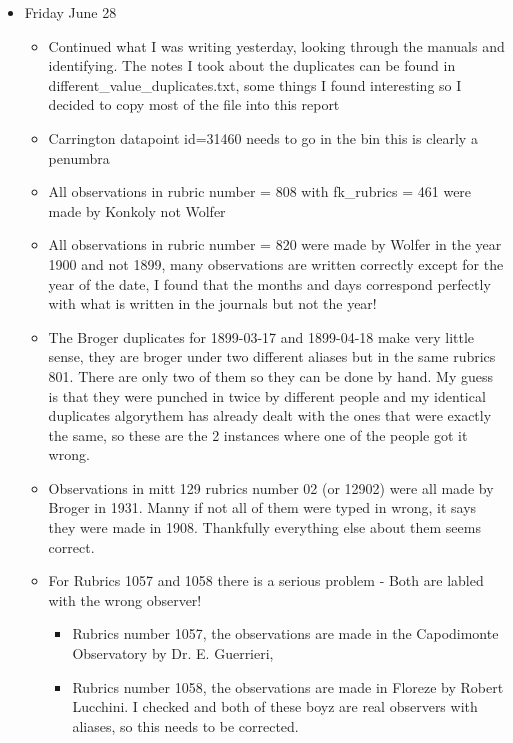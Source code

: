 \documentclass[12pt]{article}
\begin{document}
\begin{itemize}
\item Friday June 28 
    \begin{itemize}
        \item Continued what I was writing yesterday, looking through the manuals and identifying. The notes I took about the duplicates can be found in different\_value\_duplicates.txt, some things I found interesting so I decided to copy most of the file into this report
        \item Carrington datapoint id=31460 needs to go in the bin this is clearly a penumbra
        \item All observations in rubric number = 808 with fk\_rubrics = 461 were made by Konkoly not Wolfer
        \item All observations in rubric number = 820 were made by Wolfer in the year 1900 and not 1899, many observations are written correctly except for the year of the date, I found that the months and days correspond perfectly with what is written in the journals but not the year!
        \item The Broger duplicates for 1899-03-17 and 1899-04-18 make very little sense, they are broger under two different aliases but in the same rubrics 801. There are only two of them so they can be done by hand. My guess is that they were punched in twice by different people and my identical duplicates algorythem has already dealt with the ones that were exactly the same, so these are the 2 instances where one of the people got it wrong.
        \item Observations in mitt 129 rubrics number 02 (or 12902) were all made by Broger in 1931. Manny if not all of them were typed in wrong, it says they were made in 1908. Thankfully everything else about them seems correct.
        \item For Rubrics 1057 and 1058 there is a serious problem - Both are labled with the wrong observer! 
        \begin{itemize}
            \item Rubrics number 1057, the observations are made in the Capodimonte Observatory by Dr. E. Guerrieri,
            \item Rubrics number 1058, the observations are made in Floreze by Robert Lucchini. I checked and both of these boyz are real observers with aliases, so this needs to be corrected.

\end{itemize}
\end{itemize}
\end{itemize}
\end{document}
